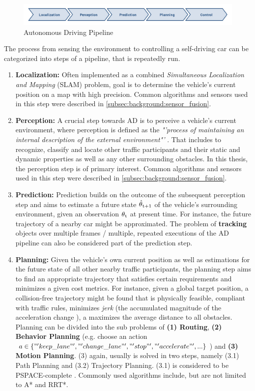 \begin{figure}[H]
	\centering
	\includegraphics[width=\textwidth]{98_images/ad_pipeline.png}
	\caption{Autonomous Driving Pipeline}
	\label{fig:autonomous_driving_pipeline}
\end{figure}

The process from sensing the environment to controlling a self-driving car can be categorized into steps of a pipeline, that is repeatedly run. 

\begin{enumerate}
	\item \textbf{Localization:} Often implemented as a combined \textit{Simultaneous Localization and Mapping} (SLAM) problem, goal is to determine the vehicle's current position on a map with high precision. Common algorithms and sensors used in this step were described in \ref{subsec:background:sensor_fusion}.
	\item \textbf{Perception:} A crucial step towards AD is to perceive a vehicle's current environment, where perception is defined as the \textit{"'process of maintaining an internal description of the external environment"'} \cite{Crowley1993}. That includes to recognize, classify and locate other traffic participants and their static and dynamic properties as well as any other surrounding obstacles. In this thesis, the perception step is of primary interest. Common algorithms and sensors used in this step were described in \ref{subsec:background:sensor_fusion}.
	\item \textbf{Prediction:} Prediction builds on the outcome of the subsequent perception step and aims to estimate a future state $\hat{\theta}\textsubscript{t+1}$ of the vehicle's surrounding environment, given an observation $\theta\textsubscript{t}$ at present time. For instance, the future trajectory of a nearby car might be approximated. The problem of \textbf{tracking} objects over multiple frames / multiple, repeated executions of the AD pipeline can also be considered part of the prediction step. 
	\item \textbf{Planning:} Given the vehicle's own current position as well as estimations for the future state of all other nearby traffic participants, the planning step aims to find an appropriate trajectory that satisfies certain requirements and minimizes a given cost metrics. For instance, given a global target position, a collision-free trajectory might be found that is physically feasible, compliant with traffic rules, minimizes \textit{jerk} (the accumulated magnitude of the acceleration change \cite{paden2016survey}), a maximizes the average distance to all obstacles. Planning can be divided into the sub problems of \textbf{(1) Routing}, \textbf{(2) Behavior Planning} (e.g. choose an action $a \in \{ "'keep\_lane"', "'change\_lane"', "'stop"', "'accelerate"', ... \}$) and \textbf{(3) Motion Planning}. (3) again, usually is solved in two steps, namely (3.1) Path Planning and (3.2) Trajectory Planning. (3.1) is considered to be PSPACE-complete \cite{paden2016survey}. Commonly used algorithms include, but are not limited to A* and RRT*.

\end{enumerate}
